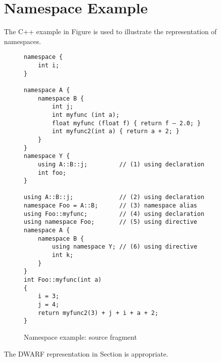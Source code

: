\section{Namespace Example}
\label{app:namespaceexample}


The C++ example in 
Figure 
is used to illustrate the representation of namespaces.

\begin{figure}[here]
\begin{lstlisting}
namespace {
    int i;
}

namespace A {
    namespace B {
        int j;
        int myfunc (int a);
        float myfunc (float f) { return f – 2.0; }
        int myfunc2(int a) { return a + 2; }
    }
}
namespace Y {
    using A::B::j;         // (1) using declaration
    int foo;
}

using A::B::j;             // (2) using declaration
namespace Foo = A::B;      // (3) namespace alias
using Foo::myfunc;         // (4) using declaration
using namespace Foo;       // (5) using directive
namespace A {
    namespace B {
        using namespace Y; // (6) using directive
        int k;
    }
}
int Foo::myfunc(int a)
{
    i = 3;
    j = 4;
    return myfunc2(3) + j + i + a + 2;
}
\end{lstlisting}
\caption{Namespace example: source fragment} \label{fig:namespaceexamplesourcefragment}
\end{figure}


The DWARF representation in 
Section 
is appropriate.

